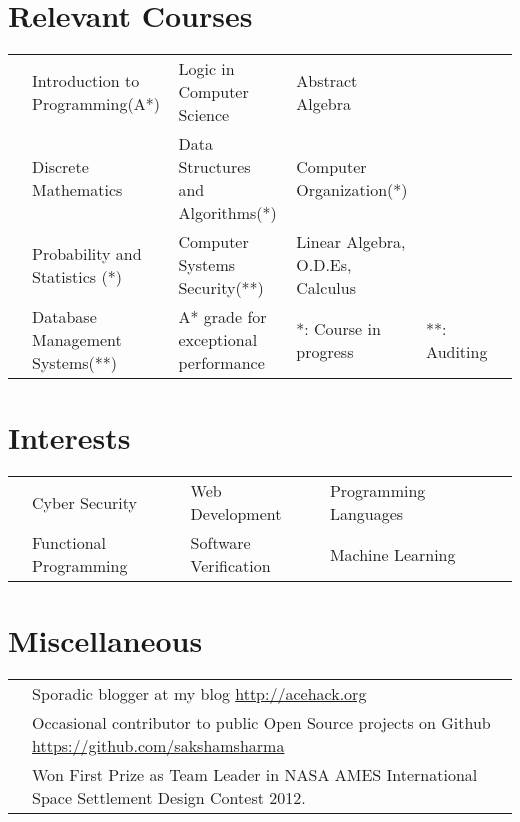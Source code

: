 \documentclass[11pt,a4paper]{moderncv}
\newcommand{\onepage}[1]{
  \ifdefined\onep
  #1
  \fi
}
\newcommand{\twopage}[1]{
  \ifdefined\twop
  #1
  \fi
}
\newcommand{\secspace}{
  \onepage{\vspace{-0.27cm}}
  \twopage{\vspace{-0.07cm}}
}
\newcommand{\secbelow}{
  \onepage{\vspace{-0.07cm}}
}
\begin{document}
\section*{Relevant Courses}
\secbelow
\begin{tabular}{L{0.05cm} L{6.2cm} L{6.5cm} L{7.5cm} L{8cm} L{13cm}}
  & Introduction to Programming(A*)  & Logic in Computer Science & Abstract Algebra\\
  & Discrete Mathematics             & Data Structures and Algorithms(*) & Computer Organization(*)\\
  & Probability and Statistics (*)  & Computer Systems Security(**) & Linear Algebra, O.D.Es, Calculus\\
  \twopage{
  & Database Management Systems(**)\\
  }
  \vspace{0.2cm}
  & \footnotesize{A* grade for exceptional performance}
                                     & \footnotesize{*: Course in progress}
                                                                 & \footnotesize{**: Auditing}
\end{tabular}

\secspace
\section*{Interests}
\secbelow
\begin{tabular}{L{0.05cm} L{5.8cm} L{6.5cm} L{7.5cm} L{8cm} L{13cm}}
  & Cyber Security         & Web Development       & Programming Languages\\
  & Functional Programming & Software Verification & Machine Learning
\end{tabular}

\twopage{
  \secspace
  \section*{Miscellaneous}
  \secbelow
  \begin{tabular}{L{0.05cm} l}
    & Sporadic blogger at my blog \url{http://acehack.org}\\
    & Occasional contributor to public Open Source projects on Github
      \url{https://github.com/sakshamsharma}\\
    \twopage{
    & Won First Prize as Team Leader in NASA AMES International Space Settlement Design
      Contest 2012.
      }
  \end{tabular}
}
\end{document}
